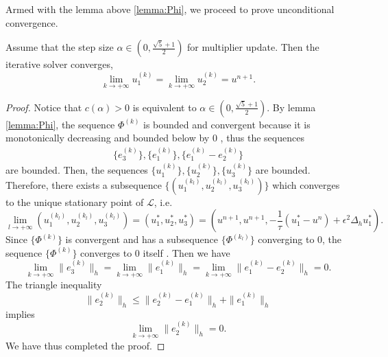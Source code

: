 Armed with the lemma above \ref{lemma:Phi}, we proceed to prove unconditional convergence.
\begin{theorem}\label{thm:convergence}
    Assume that the step size $\alpha \in (0,\frac{\sqrt{5}+1}{2})$ for multiplier update. Then the iterative solver  converges,
    \begin{equation}
        \lim_{k\to +\infty} u_1^{(k)}=
        \lim_{k\to +\infty} u_2^{(k)}=u^{n+1}.
    \end{equation}
\end{theorem}
\begin{proof}
    Notice that $c(\alpha)>0$ is equivalent to $\alpha \in (0,\frac{\sqrt{5}+1}{2})$. By lemma \ref{lemma:Phi}, the sequence $\Phi^{(k)}$ is bounded and convergent because it is monotonically decreasing and bounded below by $0$ \cite{1976Principles}, thus the sequences
    \begin{align*}
        \{e_3^{(k)}\},\{e_1^{(k)}\},\{e_1^{(k)}-e_2^{(k)}\}
    \end{align*}
    are bounded. Then, the sequences
       $ \{u_1^{(k)}\},\{u_2^{(k)}\},\{u_3^{(k)}\}$ are bounded. Therefore, there exists a subsequence $\{(u_1^{(k_l)},u_2^{(k_l)},u_3^{(k_l)}) \}$ which converges to the unique stationary point of $\mathcal{L}$, i.e.
       \begin{equation}
           \lim_{l\to +\infty}(u_1^{(k_l)},u_2^{(k_l)},u_3^{(k_l)})=(u_1^*,u_2^*,u_3^*)=(u^{n+1},u^{n+1},-\frac{1}{\tau}(u_1^*-u^n)+\epsilon^2\Delta_hu_1^*).
       \end{equation}
      Since $\{\Phi^{(k)}\}$ is convergent and has a subsequence $\{\Phi^{(k_l)}\}$ converging to $0$, the sequence $\{\Phi^{(k)}\}$ converges to $0$ itself \cite{1976Principles}. Then we have
      \begin{equation}
          \lim_{k\to +\infty}\|e_3^{(k)}\|_h=\lim_{k\to +\infty}\|e_1^{(k)}\|_h=\lim_{k\to +\infty}\|e_1^{(k)}-e_2^{(k)}\|_h=0.
      \end{equation}
      The triangle inequality \begin{equation}
          \|e_2^{(k)}\|_h\leq \|e_2^{(k)}-e_1^{(k)}\|_h+\|e_1^{(k)}\|_h 
      \end{equation}
      implies 
      \begin{equation}
          \lim_{k\to +\infty}\|e_2^{(k)}\|_h=0. 
      \end{equation}
      We have thus completed the proof.
\end{proof}

